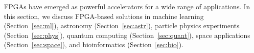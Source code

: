 
FPGAs have emerged as powerful accelerators for a wide range of applications. In this section, we discuss FPGA-based solutions in machine learning (Section~\ref{sec:ml}), astronomy (Section~\ref{sec:astr}), particle physics experiments (Section~\ref{sec:phys}), quantum computing (Section~\ref{sec:quant}), space applications (Section~\ref{sec:space}), and bioinformatics (Section~\ref{sec:bio}).

